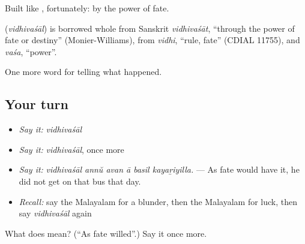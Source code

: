 Built like , fortunately: by the power of fate.

\begin{cousinweb}
\textbf{} (\emph{vidhivaśāl}) is borrowed whole from Sanskrit \emph{vidhivaśāt}, \textquotedblleft{}through the power of fate or destiny\textquotedblright{} (Monier-Williams), from \emph{vidhi}, \textquotedblleft{}rule, fate\textquotedblright{} (CDIAL 11755), and \emph{vaśa}, \textquotedblleft{}power\textquotedblright{}.
\end{cousinweb}

\begin{grammarlens}[title={What you've built}]
One more word for telling what happened.
\end{grammarlens}

\subsection*{Your turn}
\begin{itemize}
\raggedright
  \item \emph{Say it:} \emph{vidhivaśāl}
  \item \emph{Say it:} \emph{vidhivaśāl}, once more
  \item \emph{Say it:} \emph{vidhivaśāl annŭ avan ā basil kayaṟiyilla.} — As fate would have it, he did not get on that bus that day.
  \item \emph{Recall:} say the Malayalam for a blunder, then the Malayalam for luck, then say \emph{vidhivaśāl} again
\end{itemize}

\begin{tcolorbox}[breakable,colback=teal!4,colframe=teal!35!black,title={Before you move on}]
What does  mean? (\textquotedblleft{}As fate willed\textquotedblright{}.) Say it once more.
\end{tcolorbox}
